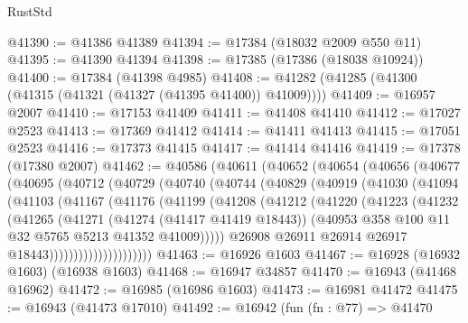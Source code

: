\begin{lexlean}{RustStd}
\begin{coremodule}
@41390 := @41386 @41389
@41394 := @17384 (@18032 @2009 @550 @11)
@41395 := @41390 @41394
@41398 := @17385 (@17386 (@18038 @10924))
@41400 := @17384 (@41398 @4985)
@41408 := @41282 (@41285 (@41300 (@41315 (@41321 (@41327 (@41395 @41400)) @41009))))
@41409 := @16957 @2007
@41410 := @17153 @41409
@41411 := @41408 @41410
@41412 := @17027 @2523
@41413 := @17369 @41412
@41414 := @41411 @41413
@41415 := @17051 @2523
@41416 := @17373 @41415
@41417 := @41414 @41416
@41419 := @17378 (@17380 @2007)
@41462 := @40586
    (@40611
      (@40652
        (@40654
          (@40656
            (@40677
              (@40695
                (@40712
                  (@40729
                    (@40740
                      (@40744
                        (@40829
                          (@40919
                            (@41030
                              (@41094
                                (@41103
                                  (@41167
                                    (@41176
                                      (@41199
                                        (@41208
                                          (@41212
                                            (@41220
                                              (@41223
                                                (@41232
                                                  (@41265
                                                    (@41271
                                                      (@41274 (@41417 @41419 @18443))
                                                      (@40953
                                                        @358
                                                        @100
                                                        @11
                                                        @32
                                                        @5765
                                                        @5213
                                                        @41352
                                                        @41009)))))
                                              @26908
                                              @26911
                                              @26914
                                              @26917
                                              @18443)))))))))))))))))))))
@41463 := @16926 @1603
@41467 := @16928 (@16932 @1603) (@16938 @1603)
@41468 := @16947 @34857
@41470 := @16943 (@41468 @16962)
@41472 := @16985 (@16986 @1603)
@41473 := @16981 @41472
@41475 := @16943 (@41473 @17010)
@41492 := @16942
    (fun (fn : @77) =>
    @41470

\end{coremodule}
\end{lexlean}
